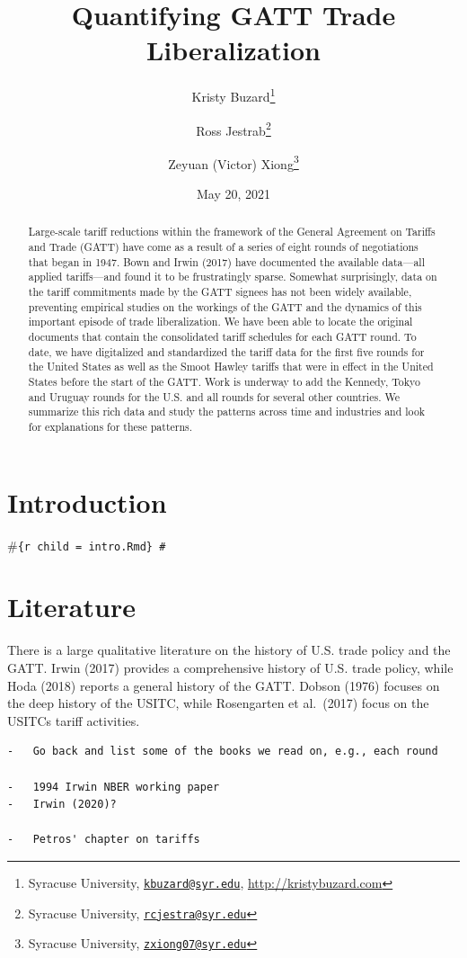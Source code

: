 \documentclass[
  12pt,
]{article}
\title{Quantifying GATT Trade Liberalization}
\author{Kristy Buzard\footnote{Syracuse University, \href{mailto:kbuzard@syr.edu}{\nolinkurl{kbuzard@syr.edu}}, \url{http://kristybuzard.com}} \and Ross Jestrab\footnote{Syracuse University, \href{mailto:rcjestra@syr.edu}{\nolinkurl{rcjestra@syr.edu}}} \and Zeyuan (Victor) Xiong\footnote{Syracuse University, \href{mailto:zxiong07@syr.edu}{\nolinkurl{zxiong07@syr.edu}}}}
\date{May 20, 2021}
\begin{document}
\maketitle
\begin{abstract}
Large-scale tariff reductions within the framework of the General Agreement on Tariffs and Trade (GATT) have come as a result of a series of eight rounds of negotiations that began in 1947. Bown and Irwin (2017) have documented the available data---all applied tariffs---and found it to be frustratingly sparse. Somewhat surprisingly, data on the tariff commitments made by the GATT signees has not been widely available, preventing empirical studies on the workings of the GATT and the dynamics of this important episode of trade liberalization. We have been able to locate the original documents that contain the consolidated tariff schedules for each GATT round. To date, we have digitalized and standardized the tariff data for the first five rounds for the United States as well as the Smoot Hawley tariffs that were in effect in the United States before the start of the GATT. Work is underway to add the Kennedy, Tokyo and Uruguay rounds for the U.S. and all rounds for several other countries. We summarize this rich data and study the patterns across time and industries and look for explanations for these patterns.
\end{abstract}

\hypertarget{introduction}{%
\section{Introduction}\label{introduction}}

\#\texttt{\{r\ child\ =\ \textquotesingle{}intro.Rmd\textquotesingle{}\}\ \#}

\hypertarget{literature}{%
\section{Literature}\label{literature}}

There is a large qualitative literature on the history of U.S. trade policy and the GATT. Irwin (2017) provides a comprehensive history of U.S. trade policy, while Hoda (2018) reports a general history of the GATT. Dobson (1976) focuses on the deep history of the USITC, while Rosengarten et al.~(2017) focus on the USITCs tariff activities.

\begin{verbatim}
-   Go back and list some of the books we read on, e.g., each round

-   1994 Irwin NBER working paper
-   Irwin (2020)?

-   Petros' chapter on tariffs
\end{verbatim}
\end{document}
